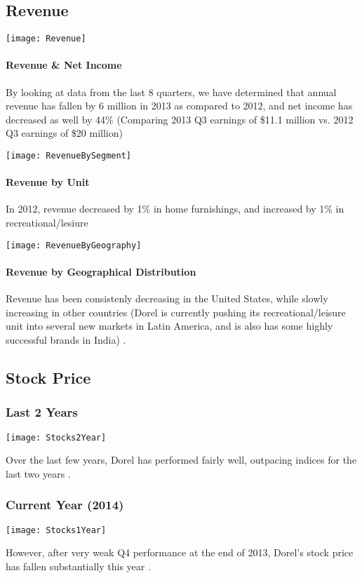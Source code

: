 {\subsection{Revenue}
\centerline{\texttt{[image: Revenue]}}
\paragraph{Revenue \& Net Income}By looking at data from the last 8 quarters, we have determined that annual revenue has fallen by 6 million in 2013 as compared to 2012, and net income has decreased as well by 44\% (Comparing 2013 Q3 earnings of \$11.1 million vs. 2012 Q3 earnings of \$20 million) 
\\[1\baselineskip]

\centerline{\texttt{[image: RevenueBySegment]}}
\paragraph{Revenue by Unit}In 2012, revenue decreased by 1\% in home furnishings, and increased by 1\% in recreational/lesiure
\\[1\baselineskip]

\centerline{\texttt{[image: RevenueByGeography]}}
\paragraph{Revenue by Geographical Distribution}Revenue has been consistenly decreasing in the United States, while slowly increasing in other countries (Dorel is currently pushing its recreational/leisure unit into several new markets in Latin America, and is also has some highly successful brands in India) \cite{BRAINStaff2013}.

\subsection {Stock Price}
\subsubsection{Last 2 Years}
\centerline{\texttt{[image: Stocks2Year]}}
Over the last few years, Dorel has performed fairly well, outpacing indices for the last two years \cite{YahooFinance2014}.

\subsubsection{Current Year (2014)}
\centerline{\texttt{[image: Stocks1Year]}}
However, after very weak Q4 performance at the end of 2013, Dorel's stock price has fallen substantially this year \cite{YahooFinance2014}.

}
